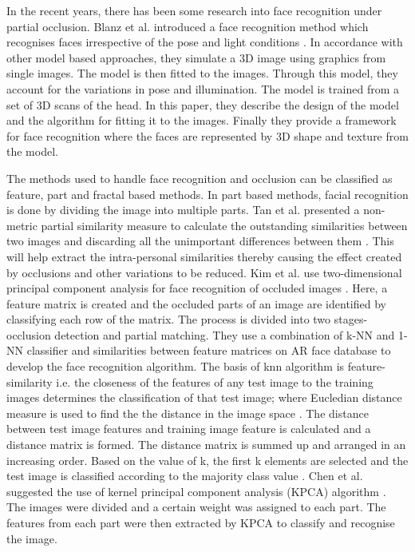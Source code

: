\documentclass[conference]{IEEEtran}
\begin{document}
In the recent years, there has been some research into face recognition under partial occlusion. Blanz et al. introduced a face recognition method which recognises faces irrespective of the pose and light conditions \cite{blanz2003face}. In accordance with other model based approaches, they simulate a 3D image using graphics from single images. The model is then fitted to the images. Through this model, they account for the variations in pose and illumination. The model is trained from a set of 3D scans of the head. In this paper, they describe the design of the model and the algorithm for fitting it to the images. Finally they provide a framework for face recognition where the faces are represented by 3D shape and texture from the model. 

The methods used to handle face recognition and occlusion can be classified as feature, part and fractal based methods. In part based methods, facial recognition is done by dividing the image into multiple parts. Tan et al. presented a non-metric partial similarity measure to calculate the outstanding similarities between two images and discarding all the unimportant differences between them \cite{tan2006learning}. This will help  extract the intra-personal similarities thereby causing the effect created by occlusions and other variations to be reduced. Kim et al. use two-dimensional principal component analysis for face recognition of occluded images \cite{kim2007occlusion}. Here, a feature matrix is created and the occluded parts of an image are identified by classifying each row of the matrix. The process is divided into two stages- occlusion detection and partial matching. They use a combination of k-NN and 1-NN classifier and similarities between feature matrices on AR face database to develop the face recognition algorithm. The basis of knn algorithm is feature-similarity  i.e. the closeness of the features of any test image to the training images determines the classification of that test image; where Eucledian distance measure is used to find the the distance in the image space \cite{wang2005euclidean}. The distance between test image features and training image feature is calculated and a distance matrix is formed. The distance matrix is summed up and arranged in an increasing order. Based on the value of k, the first k elements are selected and the test image is classified according to the majority class value \cite{zhang2007ml}. Chen et al. suggested the use of kernel principal component analysis (KPCA) algorithm \cite{chen2016recognition}. The images were divided and a certain weight was assigned to each part. The features from each part were then extracted by KPCA to classify and recognise the image.
\end{document}
